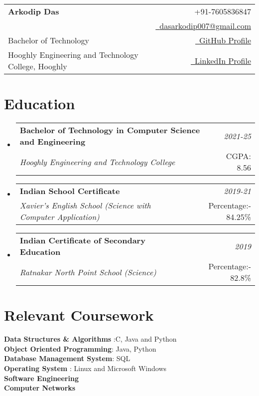 \documentclass[a4paper,11pt]{article}
\makeatletter
\newcommand{\resumeSubheading}[4]{
\vspace{0.5mm}\item
    \begin{tabular*}{0.98\textwidth}[t]{l@{\extracolsep{\fill}}r}
        \textbf{#1} & \textit{\footnotesize{#4}} \\
        \textit{\footnotesize{#3}} &  \footnotesize{#2}\\
    \end{tabular*}
    \vspace{-2.4mm}
}
\newcommand{\resumeSubHeadingListStart}{\begin{itemize}[leftmargin=*,labelsep=0mm]}
\newcommand{\resumeSubHeadingListEnd}{\end{itemize}\vspace{2mm}}
\newcommand{\name}{Arkodip Das} %
\newcommand{\phone}{7605836847} %
\newcommand{\emaila}{dasarkodip007@gmail.com} %
\makeatother
\begin{document}
\selectfont

{
\begin{tabularx}{\linewidth}{L r} \\
  \textbf{\Large \name} & {\raisebox{0.0\height}{\footnotesize \faPhone}\ +91-\phone}\\
   & \href{mailto:\emaila}{\raisebox{0.0\height}{\footnotesize \faEnvelope}\ {\emaila}} \\
  Bachelor of Technology & \href{https://github.com/arkodipdas}{\raisebox{0.0\height}{\footnotesize \faGithub}\ {GitHub Profile}} \\  
  {Hooghly Engineering and Technology College, Hooghly} & \href{www.linkedin.com/in/xxxx/}{\raisebox{0.0\height}{\footnotesize \faLinkedin}\ {LinkedIn Profile}}
\end{tabularx}
}


\section{\textbf{Education}}
  \resumeSubHeadingListStart
    \resumeSubheading
      {Bachelor of Technology in Computer Science and Engineering}{CGPA: 8.56}
      {Hooghly Engineering and Technology College}{2021-25}
  \resumeSubHeadingListEnd
\vspace{-5.5mm}
 \resumeSubHeadingListStart
    \resumeSubheading
      {Indian School Certificate}{Percentage:- 84.25\%}
      {Xavier's English School (Science with Computer Application)}{2019-21}
  \resumeSubHeadingListEnd
\vspace{-5.5mm}
 \resumeSubHeadingListStart
    \resumeSubheading
      {Indian Certificate of Secondary Education  }{Percentage:- 82.8\%}
      {Ratnakar North Point School (Science)}{2019}
  \resumeSubHeadingListEnd
\vspace{-5.5mm}
%
\section{\textbf{Relevant Coursework}}
 \begin{itemize}[leftmargin=0.05in, label={}]
    \small{\item{
 \textbf{Data Structures \& Algorithms }{:C, Java and Python} \\  
     \textbf{Object Oriented Programming}{: Java, Python} \\
    \textbf{Database Management System}{: SQL } \\ 
     \textbf{Operating System }{: Linux and Microsoft Windows}\\ 
 
\textbf{Software Engineering} \\
     \textbf{Computer Networks} \\
    }}
 \end{itemize}
 \vspace{-16pt}
\end{document}
